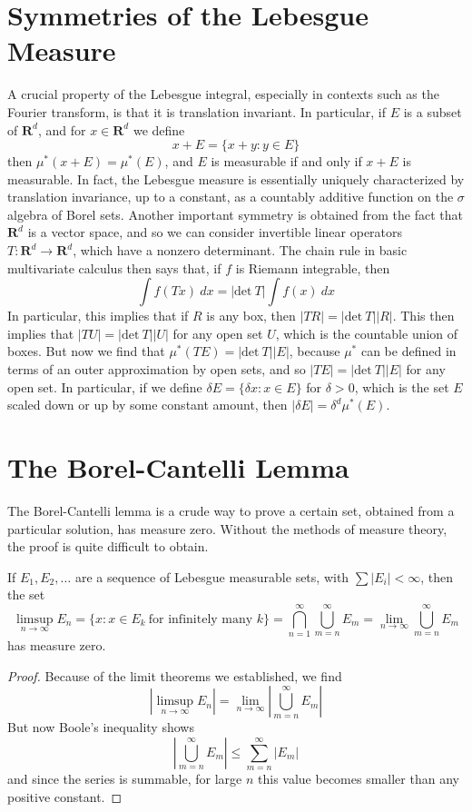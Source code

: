\section{Symmetries of the Lebesgue Measure}

A crucial property of the Lebesgue integral, especially in contexts such as the Fourier transform, is that it is translation invariant. In particular, if $E$ is a subset of $\mathbf{R}^d$, and for $x \in \mathbf{R}^d$ we define
%
\[ x + E = \{ x + y : y \in E \} \]
%
then $\mu^*(x + E) = \mu^*(E)$, and $E$ is measurable if and only if $x + E$ is measurable. In fact, the Lebesgue measure is essentially uniquely characterized by translation invariance, up to a constant, as a countably additive function on the $\sigma$ algebra of Borel sets. Another important symmetry is obtained from the fact that $\mathbf{R}^d$ is a vector space, and so we can consider invertible linear operators $T: \mathbf{R}^d \to \mathbf{R}^d$, which have a nonzero determinant. The chain rule in basic multivariate calculus then says that, if $f$ is Riemann integrable, then
%
\[ \int f(Tx)\ dx = |\text{det}\ T|\int f(x)\ dx \]
%
In particular, this implies that if $R$ is any box, then $|TR| = |\text{det}\ T| |R|$. This then implies that $|TU| = |\text{det}\ T| |U|$ for any open set $U$, which is the countable union of boxes. But now we find that $\mu^*(TE) = |\text{det}\ T| |E|$, because $\mu^*$ can be defined in terms of an outer approximation by open sets, and so $|TE| = |\text{det}\ T| |E|$ for any open set. In particular, if we define $\delta E = \{ \delta x: x \in E \}$ for $\delta > 0$, which is the set $E$ scaled down or up by some constant amount, then $|\delta E| = \delta^d \mu^*(E)$.

\section{The Borel-Cantelli Lemma}

The Borel-Cantelli lemma is a crude way to prove a certain set, obtained from a particular solution, has measure zero. Without the methods of measure theory, the proof is quite difficult to obtain.

\begin{lemma}
  If $E_1, E_2, \dots$ are a sequence of Lebesgue measurable sets, with $\sum |E_i| < \infty$, then the set
  \[ \limsup_{n \to \infty} E_n = \{ x: x \in E_k\ \text{for infinitely many $k$} \} = \bigcap_{n = 1}^\infty \bigcup_{m = n}^\infty E_m = \lim_{n \to \infty} \bigcup_{m = n}^\infty E_m \]
  has measure zero.
\end{lemma}
\begin{proof}
  Because of the limit theorems we established, we find
  \[ \left| \limsup_{n \to \infty} E_n \right| = \lim_{n \to \infty} \left| \bigcup_{m = n}^\infty E_m \right| \]
  But now Boole's inequality shows
  \[ \left| \bigcup_{m = n}^\infty E_m \right| \leq \sum_{m = n}^\infty |E_m| \]
  and since the series is summable, for large $n$ this value becomes smaller than any positive constant.
\end{proof}

